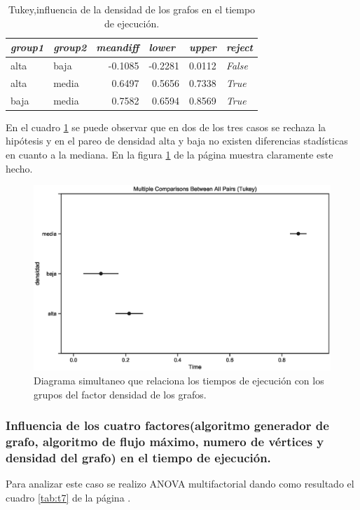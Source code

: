 \documentclass{article}
\begin{document}
\begin{table}[htbp]
  \centering
  \caption{Tukey,influencia de la densidad de los grafos en el tiempo de ejecución.}
    \begin{tabular}{llrrrl}
    \toprule
    \textit{\textbf{group1}} & \textit{\textbf{group2}} & \multicolumn{1}{l}{\textit{\textbf{meandiff}}} & \multicolumn{1}{l}{\textit{\textbf{lower}}} & \multicolumn{1}{l}{\textit{\textbf{upper}}} & \textit{\textbf{reject}} \\
    \midrule
    alta  & baja  & -0.1085 & -0.2281 & 0.0112 & \textit{False} \\
    alta  & media & 0.6497 & 0.5656 & 0.7338 & \textit{True} \\
    baja  & media & 0.7582 & 0.6594 & 0.8569 & \textit{True} \\
    \bottomrule
    \end{tabular}%
  \label{tab:t6}%
\end{table}%
En el cuadro \ref{tab:t6} se puede observar que en dos de los tres casos se rechaza la hipótesis y en el pareo de densidad alta y baja no existen diferencias stadísticas en cuanto a la mediana. En la figura \ref{fig9} de la página \pageref{fig9} muestra claramente este hecho.
\begin{center}
\begin{figure}[htbp]
\includegraphics[scale=0.6]{simultaneoustukeydensidad.eps}
\caption{Diagrama simultaneo que relaciona los tiempos de ejecución con los grupos del factor densidad de los grafos.}
\label{fig9}
\end{figure}
\end{center}
\subsubsection{Influencia de los cuatro factores(algoritmo generador de grafo, algoritmo de flujo máximo, numero de vértices y densidad del grafo) en el tiempo de ejecución.}
Para analizar este caso se realizo ANOVA multifactorial dando como resultado el cuadro \ref{tab:t7} de la página \pageref{tab:t7}.
\end{document}
